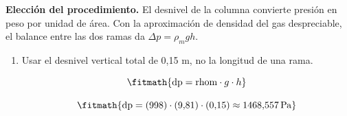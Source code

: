 \noindent\textbf{Elección del procedimiento.} El desnivel de la columna convierte presión en peso por unidad de área. Con la aproximación de densidad del gas despreciable, el balance entre las dos ramas da $\Delta p=\rho_mgh$.

\begin{enumerate}

\item Usar el desnivel vertical total de 0,15 m, no la longitud de una rama.

\[\fitmath{\mathrm{dp}=\mathrm{rhom}\cdot g\cdot h}\]

\[\fitmath{\mathrm{dp}=(998)\cdot (9{,}81)\cdot (0{,}15)\approx 1468{,}557\,\mathrm{Pa}}\]

\end{enumerate}
